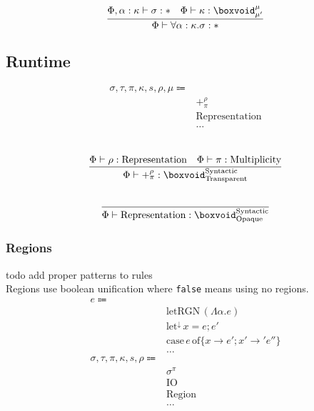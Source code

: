 \documentclass {article}
\begin{document}
\begin{gather*}
\frac
{\Phi, \alpha : \kappa \vdash \sigma : * \quad \Phi \vdash \kappa : \boxvoid^\mu_{\mu'}}
{\Phi \vdash \forall \alpha : \kappa. \sigma : * } \\
\end{gather*}

\subsection{Runtime}

\begin{align*}
\sigma, \tau, \pi, \kappa, s, \rho, \mu \Coloneqq & \\
& +^\rho_\pi \tag{Pretype}\\
& \text{Representation} \tag {Representation}\\
& \dots
\end{align*}

\begin{gather*}
\\
\frac
{\Phi \vdash \rho : \text{Representation} \quad \Phi \vdash \pi : \text{Multiplicity}}
{\Phi \vdash +^\rho_\pi : \boxvoid^{\text{Syntactic}}_{\text{Transparent}}} \\
\\
\frac
{}
{\Phi \vdash \text{Representation} : \boxvoid^{\text{Syntactic}}_{\text{Opaque}}}
\end{gather*}

\subsubsection{Regions}
todo add proper patterns to rules \\
Regions use boolean unification where \texttt{false} means using no regions.
\begin{align*}
e \Coloneqq & \\
& \text{letRGN} \, (\Lambda \alpha. e) \tag{Bind Region Type Variable (Unused)} \\
& \text{let}^\downarrow \, x = e; e' \tag{Runtime Let} \\
& \text{case} \, e \, \text{of} \{ x \to e'; x' \to' e''\} \tag{Case} \\
& \dots \\
\sigma, \tau, \pi, \kappa, s, \rho \Coloneqq & \\
& \sigma^\pi \tag{Region Effect} \\
& \text{IO} \tag{IO Region} \\
& \text{Region} \tag{Region} \\
& \dots
\end{align*}
\end{document}
